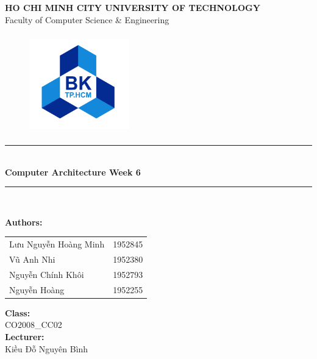\documentclass[12pt,a4paper]{article}
\newcommand\HRule{\rule{12cm}{1pt}}
\begin{document}
\begin{titlepage}

  \begin{center}

    \textbf{\fontsize{12pt}{1pt}\selectfont HO CHI MINH CITY UNIVERSITY OF TECHNOLOGY}\\[0.5cm]
    {\fontsize{13pt}{1pt}\selectfont Faculty of Computer Science \& Engineering}\\[0.5cm]
    \begin{figure}[H]
      \centering
      \includegraphics[width=1.7in,height=1.7in]{BK.png}
    \end{figure}

    \HRule\\[0.5cm]
    { \textbf{\fontsize{25pt}{1pt}\selectfont Computer Architecture Week 6}}\\[0.4cm]

    \HRule\\[0.8cm]
    \begin{minipage}{0.545\textwidth}
      \begin{flushleft}
        \textbf{Authors:}\\
        \begin{tabular}{l l}
          Lưu Nguyễn Hoàng Minh & 1952845 \\
          Vũ Anh Nhi            & 1952380 \\
          Nguyễn Chính Khôi     & 1952793 \\
          Nguyễn Hoàng          & 1952255 \\
        \end{tabular}
      \end{flushleft}
    \end{minipage}
    \begin{minipage}{0.4\textwidth}
      \begin{flushright}
        \textbf{Class:}\\
        CO2008\_CC02\\
        \textbf{Lecturer:}\\
        Kiều Đỗ Nguyên Bình\\


\end{flushright}
\end{minipage}
\end{center}
\end{titlepage}
\end{document}
